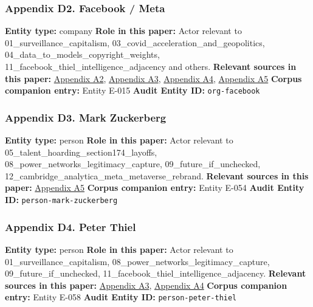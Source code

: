 \documentclass[
  american,
  11pt,
  letterpaper,
]{article}
\begin{document}
\subsubsection{Appendix D2. Facebook /
Meta}\label{appendix-d2-facebook-meta}

\textbf{Entity type:} company \textbf{Role in this paper:} Actor
relevant to 01\_surveillance\_capitalism,
03\_covid\_acceleration\_and\_geopolitics,
04\_data\_to\_models\_copyright\_weights,
11\_facebook\_thiel\_intelligence\_adjacency and others.
\textbf{Relevant sources in this paper:}
\hyperref[appendix-a2-ftc-imposes-5-billion-penalty-and-sweeping-new-privacy-restrictions-on-facebook]{Appendix
A2},
\hyperref[appendix-a3-facebook-inc-registration-statement-on-form-s-1]{Appendix
A3},
\hyperref[appendix-a4-meta-platforms-inc-2022-definitive-proxy-statement]{Appendix
A4}, \hyperref[appendix-a5-the-facebook-company-is-now-meta]{Appendix
A5} \textbf{Corpus companion entry:} Entity E-015 \textbf{Audit Entity
ID:} \texttt{org-facebook}

\subsubsection{Appendix D3. Mark
Zuckerberg}\label{appendix-d3-mark-zuckerberg}

\textbf{Entity type:} person \textbf{Role in this paper:} Actor relevant
to 05\_talent\_hoarding\_section174\_layoffs,
08\_power\_networks\_legitimacy\_capture, 09\_future\_if\_unchecked,
12\_cambridge\_analytica\_meta\_metaverse\_rebrand. \textbf{Relevant
sources in this paper:}
\hyperref[appendix-a5-the-facebook-company-is-now-meta]{Appendix A5}
\textbf{Corpus companion entry:} Entity E-054 \textbf{Audit Entity ID:}
\texttt{person-mark-zuckerberg}

\subsubsection{Appendix D4. Peter Thiel}\label{appendix-d4-peter-thiel}

\textbf{Entity type:} person \textbf{Role in this paper:} Actor relevant
to 01\_surveillance\_capitalism,
08\_power\_networks\_legitimacy\_capture, 09\_future\_if\_unchecked,
11\_facebook\_thiel\_intelligence\_adjacency. \textbf{Relevant sources
in this paper:}
\hyperref[appendix-a3-facebook-inc-registration-statement-on-form-s-1]{Appendix
A3},
\hyperref[appendix-a4-meta-platforms-inc-2022-definitive-proxy-statement]{Appendix
A4} \textbf{Corpus companion entry:} Entity E-058 \textbf{Audit Entity
ID:} \texttt{person-peter-thiel}
\end{document}
